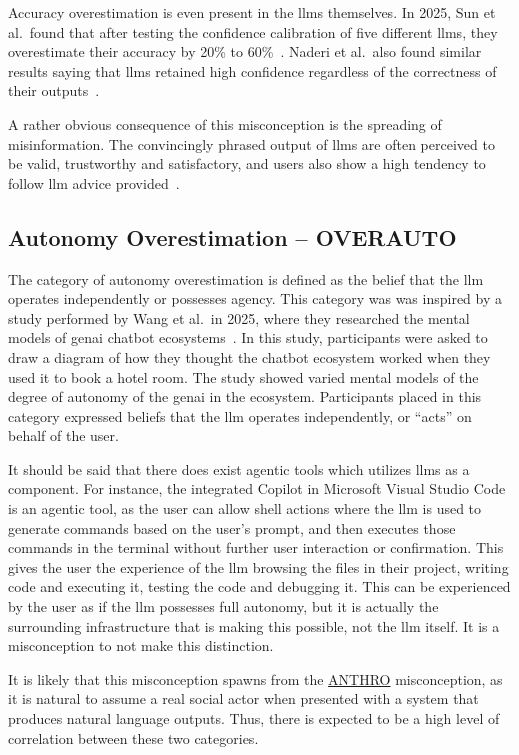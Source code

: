 Accuracy overestimation is even present in the \gls{llms} themselves. In 2025, Sun et al.\ found that after testing the confidence calibration of five different \gls{llms}, they overestimate their accuracy by 20\% to 60\%~\cite{sun_large_2025}. Naderi et al.\ also found similar results saying that \gls{llms} retained high confidence regardless of the correctness of their outputs~\cite{naderi_across_2026}.

A rather obvious consequence of this misconception is the spreading of misinformation. The convincingly phrased output of \gls{llms} are often perceived to be valid, trustworthy and satisfactory, and users also show a high tendency to follow \gls{llm} advice provided~\cite{shekar_people_2025}.

\subsection{Autonomy Overestimation -- OVERAUTO}\label{overauto}
The category of autonomy overestimation is defined as the belief that the \gls{llm} operates independently or possesses agency. This category was was inspired by a study performed by Wang et al.\ in 2025, where they researched the mental models of \gls{genai} chatbot ecosystems~\cite{wang_mental_2025}. In this study, participants were asked to draw a diagram of how they thought the chatbot ecosystem worked when they used it to book a hotel room. The study showed varied mental models of the degree of autonomy of the \gls{genai} in the ecosystem. Participants placed in this category expressed beliefs that the \gls{llm} operates independently, or ``acts'' on behalf of the user.

It should be said that there does exist agentic tools which utilizes \gls{llms} as a component. For instance, the integrated Copilot in Microsoft Visual Studio Code is an agentic tool, as the user can allow shell actions where the \gls{llm} is used to generate commands based on the user's prompt, and then executes those commands in the terminal without further user interaction or confirmation. This gives the user the experience of the \gls{llm} browsing the files in their project, writing code and executing it, testing the code and debugging it. This can be experienced by the user as if the \gls{llm} possesses full autonomy, but it is actually the surrounding infrastructure that is making this possible, not the \gls{llm} itself. It is a misconception to not make this distinction.

It is likely that this misconception spawns from the \hyperref[anthro]{ANTHRO} misconception, as it is natural to assume a real social actor when presented with a system that produces natural language outputs\cite{reinecke_double-edged_2025,jose_digital_2025}. Thus, there is expected to be a high level of correlation between these two categories.

